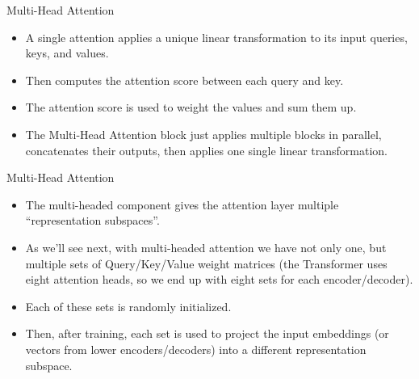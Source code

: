 \documentclass[handout]{beamer}
\begin{document}
\begin{frame}{Multi-Head Attention}
\begin{scriptsize}
\begin{itemize}

 \item A single attention applies a unique linear transformation to its input queries, keys, and values.
 
 \item Then computes the attention score between each query and key.
 
 \item The attention score is used to weight the values and sum them up.


\item The Multi-Head Attention block just applies multiple blocks in parallel, concatenates their outputs, then applies one single linear transformation. 
 
\end{itemize}

\end{scriptsize}

\end{frame}




\begin{frame}{Multi-Head Attention}
\begin{scriptsize}


\begin{itemize}


\item The multi-headed component gives the attention layer multiple ``representation subspaces''.
\item As we’ll see next, with multi-headed attention we have not only one, but multiple sets of Query/Key/Value weight matrices (the Transformer uses eight attention heads, so we end up with eight sets for each encoder/decoder). 
\item Each of these sets is randomly initialized. 

\item Then, after training, each set is used to project the input embeddings (or vectors from lower encoders/decoders) into a different representation subspace.

 
\end{itemize}

\end{scriptsize}

\end{frame}
\end{document}

